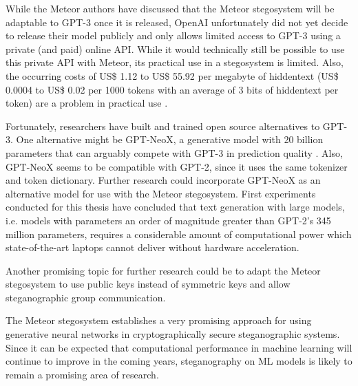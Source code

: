 While the Meteor authors have discussed that the Meteor stegosystem will be adaptable to GPT-3 once it is released, OpenAI unfortunately did not yet decide to release their model publicly and only allows limited access to GPT-3 using a private (and paid) online API.
While it would technically still be possible to use this private API with Meteor, its practical use in a stegosystem is limited.
Also, the occurring costs of US\$ 1.12 to US\$ 55.92 per megabyte of hiddentext (US\$ 0.0004 to US\$ 0.02 per 1000 tokens with an average of 3 bits of hiddentext per token) are a problem in practical use \cite{OpenAIPricing2022}.

Fortunately, researchers have built and trained open source alternatives to GPT-3.
One alternative might be GPT-NeoX, a generative model with 20 billion parameters that can arguably compete with GPT-3 in prediction quality \cite{GPTneo2022}.
Also, GPT-NeoX seems to be compatible with GPT-2, since it uses the same tokenizer and token dictionary.
Further research could incorporate GPT-NeoX as an alternative model for use with the Meteor stegosystem.
First experiments conducted for this thesis have concluded that text generation with large models, i.e. models with parameters an order of magnitude greater than GPT-2's 345 million parameters, requires a considerable amount of computational power which state-of-the-art laptops cannot deliver without hardware acceleration.

Another promising topic for further research could be to adapt the Meteor stegosystem to use public keys instead of symmetric keys and allow steganographic group communication.

The Meteor stegosystem establishes a very promising approach for using generative neural networks in cryptographically secure steganographic systems.
Since it can be expected that computational performance in machine learning will continue to improve in the coming years, steganography on ML models is likely to remain a promising area of research.